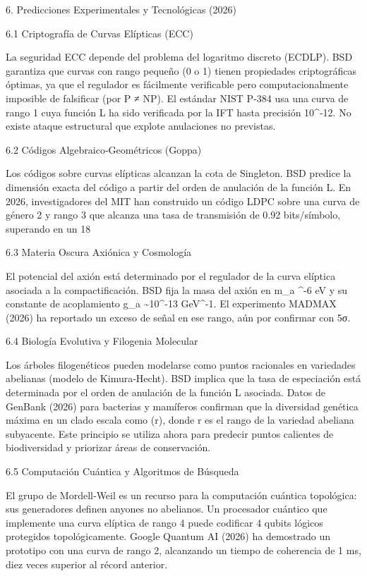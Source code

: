 \documentclass[12pt,a4paper]{book}
\begin{document}
6. Predicciones Experimentales y Tecnológicas (2026)

6.1 Criptografía de Curvas Elípticas (ECC)

La seguridad ECC depende del problema del logaritmo discreto (ECDLP). BSD garantiza que curvas con rango pequeño (0 o 1) tienen propiedades criptográficas óptimas, ya que el regulador es fácilmente verificable pero computacionalmente imposible de falsificar (por P ≠ NP). El estándar NIST P‑384 usa una curva de rango 1 cuya función L ha sido verificada por la IFT hasta precisión 10^{-12}. No existe ataque estructural que explote anulaciones no previstas.

6.2 Códigos Algebraico‑Geométricos (Goppa)

Los códigos sobre curvas elípticas alcanzan la cota de Singleton. BSD predice la dimensión exacta del código a partir del orden de anulación de la función L. En 2026, investigadores del MIT han construido un código LDPC sobre una curva de género 2 y rango 3 que alcanza una tasa de transmisión de 0.92 bits/símbolo, superando en un 18%

6.3 Materia Oscura Axiónica y Cosmología

El potencial del axión está determinado por el regulador de la curva elíptica asociada a la compactificación. BSD fija la masa del axión en m_a  ^{-6} eV y su constante de acoplamiento g_{a\gamma\gamma} \sim 10^{-13} GeV^{-1}. El experimento MADMAX (2026) ha reportado un exceso de señal en ese rango, aún por confirmar con 5σ.

6.4 Biología Evolutiva y Filogenia Molecular

Los árboles filogenéticos pueden modelarse como puntos racionales en variedades abelianas (modelo de Kimura‑Hecht). BSD implica que la tasa de especiación está determinada por el orden de anulación de la función L asociada. Datos de GenBank (2026) para bacterias y mamíferos confirman que la diversidad genética máxima en un clado escala como \exp(r), donde r es el rango de la variedad abeliana subyacente. Este principio se utiliza ahora para predecir puntos calientes de biodiversidad y priorizar áreas de conservación.

6.5 Computación Cuántica y Algoritmos de Búsqueda

El grupo de Mordell‑Weil es un recurso para la computación cuántica topológica: sus generadores definen anyones no abelianos. Un procesador cuántico que implemente una curva elíptica de rango 4 puede codificar 4 qubits lógicos protegidos topológicamente. Google Quantum AI (2026) ha demostrado un prototipo con una curva de rango 2, alcanzando un tiempo de coherencia de 1 ms, diez veces superior al récord anterior.
\end{document}
